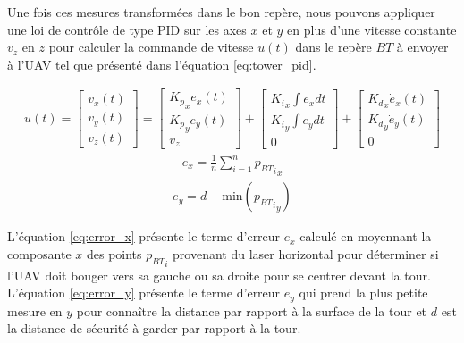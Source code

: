 Une fois ces mesures transformées dans le bon repère, nous pouvons appliquer une loi de contrôle de type PID sur les axes $x$ et $y$ en plus d'une vitesse constante $v_z$ en $z$ pour calculer la commande de vitesse $u(t)$ dans le repère ${BT}$ à envoyer à l'UAV tel que présenté dans l'équation \ref{eq:tower_pid}.

\begin{align}
  u(t) = \begin{bmatrix}v_x(t)\\ v_y(t)\\ v_z(t)\end{bmatrix} =
  \begin{bmatrix}{K_p}_x e_x(t)\\ {K_p}_y e_y(t)\\ v_z\end{bmatrix} +
  \begin{bmatrix}{K_i}_x \int e_x dt\\ {K_i}_y \int e_y dt\\ 0\end{bmatrix} +
  \begin{bmatrix}{K_d}_x \dot{e}_x(t)\\ {K_d}_y \dot{e}_y(t)\\ 0\end{bmatrix}
  \label{eq:tower_pid}
\end{align}
\begin{align}
  e_x = \frac{1}{n} \sum_{i = 1}^n {{p_{BT}}_i}_x
  \label{eq:error_x}
\end{align}
\begin{align}
  e_y = d - {\text{min}}({{p_{BT}}_i}_y)
  \label{eq:error_y}
\end{align}

L'équation \ref{eq:error_x} présente le terme d'erreur $e_x$ calculé en moyennant la composante $x$ des points ${p_{BT}}_i$ provenant du laser horizontal pour déterminer si l'UAV doit bouger vers sa gauche ou sa droite pour se centrer devant la tour. L'équation \ref{eq:error_y} présente le terme d'erreur $e_y$ qui prend la plus petite mesure en $y$ pour connaître la distance par rapport à la surface de la tour et $d$ est la distance de sécurité à garder par rapport à la tour.

